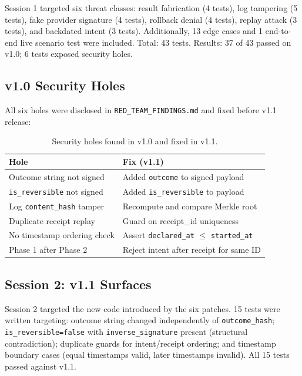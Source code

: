 \documentclass[10pt,twocolumn]{article}
\begin{document}
Session 1 targeted six threat classes: result fabrication (4 tests),
log tampering (5 tests), fake provider signature (4 tests), rollback denial
(4 tests), replay attack (3 tests), and backdated intent (3 tests).
Additionally, 13 edge cases and 1 end-to-end live scenario test were included.
Total: 43 tests. Results: 37 of 43 passed on v1.0; 6 tests exposed security holes.

\subsection{v1.0 Security Holes}

All six holes were disclosed in \texttt{RED\_TEAM\_FINDINGS.md} and fixed before
v1.1 release:

\begin{table}[h]
\centering
\footnotesize
\caption{Security holes found in v1.0 and fixed in v1.1.}
\label{tab:holes}
\begin{tabular}{p{3.4cm} p{4.0cm}}
\toprule
\textbf{Hole} & \textbf{Fix (v1.1)} \\
\midrule
Outcome string not signed & Added \texttt{outcome} to signed payload \\
\texttt{is\_reversible} not signed & Added \texttt{is\_reversible} to payload \\
Log \texttt{content\_hash} tamper & Recompute and compare Merkle root \\
Duplicate receipt replay & Guard on receipt\_id uniqueness \\
No timestamp ordering check & Assert \texttt{declared\_at} $\le$ \texttt{started\_at} \\
Phase 1 after Phase 2 & Reject intent after receipt for same ID \\
\bottomrule
\end{tabular}
\end{table}

\subsection{Session 2: v1.1 Surfaces}

Session 2 targeted the new code introduced by the six patches. 15 tests
were written targeting: outcome string changed independently of
\texttt{outcome\_hash}; \texttt{is\_reversible=false} with
\texttt{inverse\_signature} present (structural contradiction); duplicate
guards for intent/receipt ordering; and timestamp boundary cases (equal
timestamps valid, later timestamps invalid). All 15 tests passed against v1.1.
\end{document}
